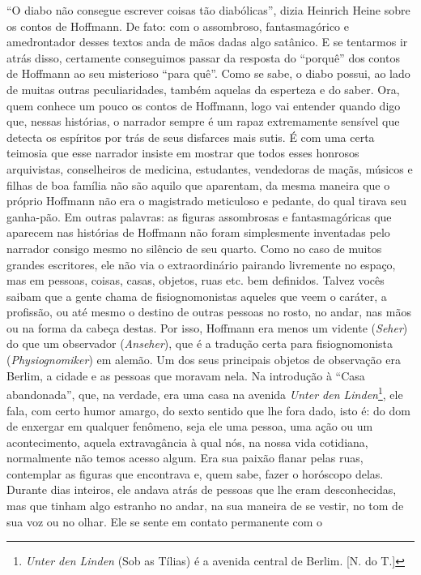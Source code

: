 ``O diabo não consegue escrever coisas tão diabólicas'', dizia Heinrich
Heine sobre os contos de Hoffmann. De fato: com o assombroso,
fantasmagórico e amedrontador desses textos anda de mãos dadas algo
satânico. E se tentarmos ir atrás disso, certamente conseguimos passar
da resposta do ``porquê'' dos contos de Hoffmann ao seu misterioso
``para quê''. Como se sabe, o diabo possui, ao lado de muitas outras
peculiaridades, também aquelas da esperteza e do saber. Ora, quem
conhece um pouco os contos de Hoffmann, logo vai entender quando digo
que, nessas histórias, o narrador sempre é um rapaz extremamente
sensível que detecta os espíritos por trás de seus disfarces mais sutis.
É com uma certa teimosia que esse narrador insiste em mostrar que todos
esses honrosos arquivistas, conselheiros de medicina, estudantes,
vendedoras de maçãs, músicos e filhas de boa família não são aquilo que
aparentam, da mesma maneira que o próprio Hoffmann não era o magistrado
meticuloso e pedante, do qual tirava seu ganha-pão. Em outras palavras:
as figuras assombrosas e fantasmagóricas que aparecem nas histórias de
Hoffmann não foram simplesmente inventadas pelo narrador consigo mesmo
no silêncio de seu quarto. Como no caso de muitos grandes escritores,
ele não via o extraordinário pairando livremente no espaço, mas em
pessoas, coisas, casas, objetos, ruas etc. bem definidos. Talvez vocês
saibam que a gente chama de fisiognomonistas aqueles que veem o caráter,
a profissão, ou até mesmo o destino de outras pessoas no rosto, no
andar, nas mãos ou na forma da cabeça destas. Por isso, Hoffmann era
menos um vidente (\emph{Seher}) do que um observador (\emph{Anseher}),
que é a tradução certa para fisiognomonista (\emph{Physiognomiker}) em
alemão. Um dos seus principais objetos de observação era Berlim, a
cidade e as pessoas que moravam nela. Na introdução à ``Casa
abandonada'', que, na verdade, era uma casa na avenida \emph{Unter den
Linden}\footnote{\emph{Unter den Linden} (Sob as Tílias) é a avenida
  central de Berlim. [N. do T.]}, ele fala, com certo humor amargo,
do sexto sentido que lhe fora dado, isto é: do dom de enxergar em
qualquer fenômeno, seja ele uma pessoa, uma ação ou um acontecimento,
aquela extravagância à qual nós, na nossa vida cotidiana, normalmente
não temos acesso algum. Era sua paixão flanar pelas ruas, contemplar as
figuras que encontrava e, quem sabe, fazer o horóscopo delas. Durante
dias inteiros, ele andava atrás de pessoas que lhe eram desconhecidas,
mas que tinham algo estranho no andar, na sua maneira de se vestir, no
tom de sua voz ou no olhar. Ele se sente em contato permanente com o

